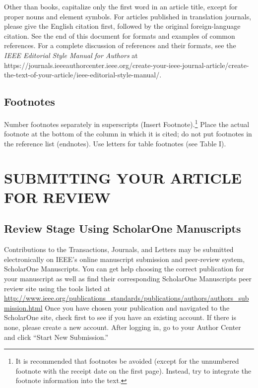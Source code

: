 \documentclass[correspondence]{IEEEtaes}
\begin{document}
Other than books, capitalize only the first word in an article title, except for proper nouns and element symbols. For articles published in translation journals, please give the English citation first, followed by the original foreign-language citation. See the end of this document for formats and examples of common references. For a complete discussion of references and their formats, see the \emph{IEEE Editorial Style Manual} \emph{for Authors} at {{https://journals.ieeeauthorcenter.ieee.org/create-your-ieee-journal-article/create-the-text-of-your-article/ieee-editorial-style-manual/}}.

\subsection{Footnotes}

Number footnotes separately in superscripts (Insert \textbar{}Footnote).\footnote{It is recommended that footnotes be avoided (except for the unnumbered footnote with the receipt date on the first page). Instead, try to integrate the footnote information into the text.} Place the actual footnote at the bottom of the column in which it is cited; do not put footnotes in the reference list (endnotes). Use letters for table footnotes (see Table I).

\section{SUBMITTING YOUR ARTICLE FOR REVIEW}

\subsection{Review Stage Using ScholarOne Manuscripts}

Contributions to the Transactions, Journals, and Letters may be submitted electronically on IEEE's online manuscript submission and peer-review system, ScholarOne Manuscripts. You can get help choosing the correct publication for your manuscript as well as find their corresponding ScholarOne Manuscripts peer review site using the tools listed at \href{http://www.ieee.org/publications\_standards/publications/authors/authors\_submission.html}{\url{http://www.ieee.org/publications\_standards/publications/authors/authors\_submission.html}} Once you have chosen your publication and navigated to the ScholarOne site, check first to see if you have an existing account. If there is none, please create a new account. After logging in, go to your Author Center and click ``Start New Submission.''
\end{document}
